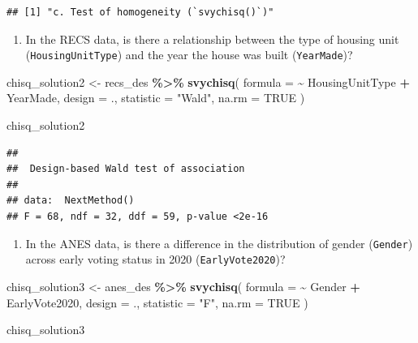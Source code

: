 \documentclass[
]{krantz}
\makeatletter
\newenvironment{Shaded}{\begin{snugshade}}{\end{snugshade}}
\newcommand{\AttributeTok}[1]{\textcolor[rgb]{0.27,0.27,0.27}{#1}}
\newcommand{\ConstantTok}[1]{\textcolor[rgb]{0.37,0.37,0.37}{#1}}
\newcommand{\FunctionTok}[1]{\textcolor[rgb]{0.27,0.27,0.27}{\textbf{#1}}}
\newcommand{\NormalTok}[1]{#1}
\newcommand{\OtherTok}[1]{\textcolor[rgb]{0.37,0.37,0.37}{#1}}
\newcommand{\SpecialCharTok}[1]{\textcolor[rgb]{0.43,0.43,0.43}{\textbf{#1}}}
\newcommand{\StringTok}[1]{\textcolor[rgb]{0.5,0.5,0.5}{#1}}
\providecommand{\tightlist}{%
  \setlength{\itemsep}{0pt}\setlength{\parskip}{0pt}}
\newenvironment{kframe}{%
\medskip{}
\setlength{\fboxsep}{.8em}
 \def\at@end@of@kframe{}%
 \ifinner\ifhmode%
  \def\at@end@of@kframe{\end{minipage}}%
  \begin{minipage}{\columnwidth}%
 \fi\fi%
 \def\FrameCommand##1{\hskip\@totalleftmargin \hskip-\fboxsep
 \colorbox{shadecolor}{##1}\hskip-\fboxsep
     \hskip-\linewidth \hskip-\@totalleftmargin \hskip\columnwidth}%
 \MakeFramed {\advance\hsize-\width
   \@totalleftmargin\z@ \linewidth\hsize
   \@setminipage}}%
 {\par\unskip\endMakeFramed%
 \at@end@of@kframe}
\renewenvironment{Shaded}{\begin{kframe}}{\end{kframe}}
\makeatother
\begin{document}
\begin{verbatim}
## [1] "c. Test of homogeneity (`svychisq()`)"
\end{verbatim}

\begin{enumerate}
\def\labelenumi{\arabic{enumi}.}
\setcounter{enumi}{4}
\tightlist
\item
  In the RECS data, is there a relationship between the type of housing unit (\texttt{HousingUnitType}) and the year the house was built (\texttt{YearMade})?
\end{enumerate}

\begin{Shaded}
\begin{Highlighting}[]
\NormalTok{chisq\_solution2 }\OtherTok{\textless{}{-}}\NormalTok{ recs\_des }\SpecialCharTok{\%\textgreater{}\%}
  \FunctionTok{svychisq}\NormalTok{(}
    \AttributeTok{formula =} \SpecialCharTok{\textasciitilde{}}\NormalTok{ HousingUnitType }\SpecialCharTok{+}\NormalTok{ YearMade,}
    \AttributeTok{design =}\NormalTok{ .,}
    \AttributeTok{statistic =} \StringTok{"Wald"}\NormalTok{,}
    \AttributeTok{na.rm =} \ConstantTok{TRUE}
\NormalTok{  )}

\NormalTok{chisq\_solution2}
\end{Highlighting}
\end{Shaded}

\begin{verbatim}
## 
##  Design-based Wald test of association
## 
## data:  NextMethod()
## F = 68, ndf = 32, ddf = 59, p-value <2e-16
\end{verbatim}

\begin{enumerate}
\def\labelenumi{\arabic{enumi}.}
\setcounter{enumi}{5}
\tightlist
\item
  In the ANES data, is there a difference in the distribution of gender (\texttt{Gender}) across early voting status in 2020 (\texttt{EarlyVote2020})?
\end{enumerate}

\begin{Shaded}
\begin{Highlighting}[]
\NormalTok{chisq\_solution3 }\OtherTok{\textless{}{-}}\NormalTok{ anes\_des }\SpecialCharTok{\%\textgreater{}\%}
  \FunctionTok{svychisq}\NormalTok{(}
    \AttributeTok{formula =} \SpecialCharTok{\textasciitilde{}}\NormalTok{ Gender }\SpecialCharTok{+}\NormalTok{ EarlyVote2020,}
    \AttributeTok{design =}\NormalTok{ .,}
    \AttributeTok{statistic =} \StringTok{"F"}\NormalTok{,}
    \AttributeTok{na.rm =} \ConstantTok{TRUE}
\NormalTok{  )}

\NormalTok{chisq\_solution3}
\end{Highlighting}
\end{Shaded}
\end{document}
